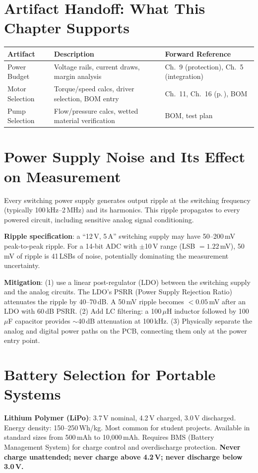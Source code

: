 \documentclass[11pt,letterpaper,twoside,openany]{book}
\begin{document}
\section{Artifact Handoff: What This Chapter Supports}
\begin{table}[htbp]\centering\small
\begin{tabularx}{\textwidth}{l X l}
\toprule
\textbf{Artifact} & \textbf{Description} & \textbf{Forward Reference} \\
\midrule
Power Budget & Voltage rails, current draws, margin analysis & Ch.~9 (protection), Ch.~5 (integration) \\
Motor Selection & Torque/speed calcs, driver selection, BOM entry & Ch.~11, Ch.~16 (p.\,\pageref{ch:transmission}), BOM \\
Pump Selection & Flow/pressure calcs, wetted material verification & BOM, test plan \\
\bottomrule
\end{tabularx}
\end{table}

\section{Power Supply Noise and Its Effect on Measurement}
Every switching power supply generates output ripple at the switching frequency (typically 100\,kHz--2\,MHz) and its harmonics. This ripple propagates to every powered circuit, including sensitive analog signal conditioning.

\textbf{Ripple specification}: a ``12\,V, 5\,A'' switching supply may have 50--200\,mV peak-to-peak ripple. For a 14-bit ADC with $\pm$10\,V range (LSB $= 1.22$\,mV), 50\,mV of ripple is 41\,LSBs of noise, potentially dominating the measurement uncertainty.

\textbf{Mitigation}: (1) use a linear post-regulator (LDO) between the switching supply and the analog circuits. The LDO's PSRR (Power Supply Rejection Ratio) attenuates the ripple by 40--70\,dB. A 50\,mV ripple becomes $< 0.05$\,mV after an LDO with 60\,dB PSRR. (2) Add LC filtering: a 100\,$\mu$H inductor followed by 100\,$\mu$F capacitor provides $\sim$40\,dB attenuation at 100\,kHz. (3) Physically separate the analog and digital power paths on the PCB, connecting them only at the power entry point.

\section{Battery Selection for Portable Systems}
\textbf{Lithium Polymer (LiPo)}: 3.7\,V nominal, 4.2\,V charged, 3.0\,V discharged. Energy density: 150--250\,Wh/kg. Most common for student projects. Available in standard sizes from 500\,mAh to 10{,}000\,mAh. Requires BMS (Battery Management System) for charge control and overdischarge protection. \textbf{Never charge unattended; never charge above 4.2\,V; never discharge below 3.0\,V.}
\end{document}
